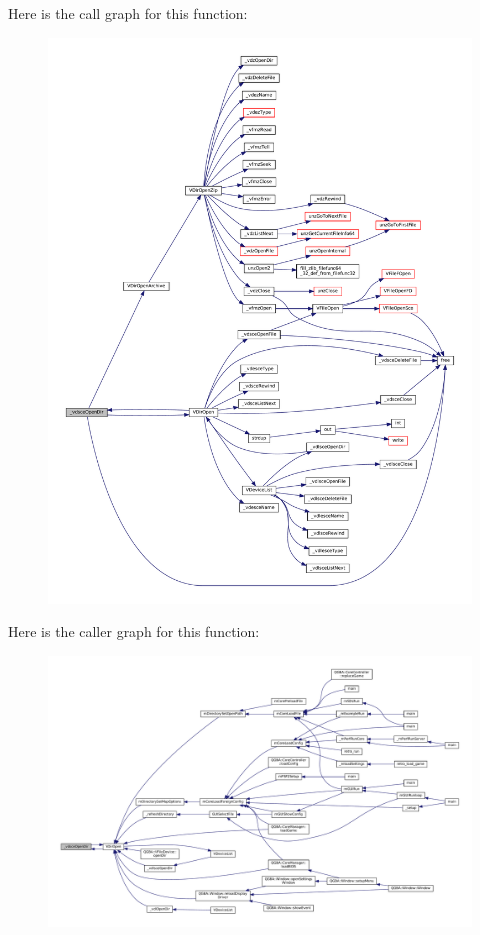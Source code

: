 Here is the call graph for this function\+:
\nopagebreak
\begin{figure}[H]
\begin{center}
\leavevmode
\includegraphics[width=350pt]{sce-vfs_8c_a7b060e37958afd93372f841b613595a2_cgraph}
\end{center}
\end{figure}
Here is the caller graph for this function\+:
\nopagebreak
\begin{figure}[H]
\begin{center}
\leavevmode
\includegraphics[width=350pt]{sce-vfs_8c_a7b060e37958afd93372f841b613595a2_icgraph}
\end{center}
\end{figure}
\mbox{\label{sce-vfs_8c_aa6c4428f224691c2646883dde2b7936d}} 
